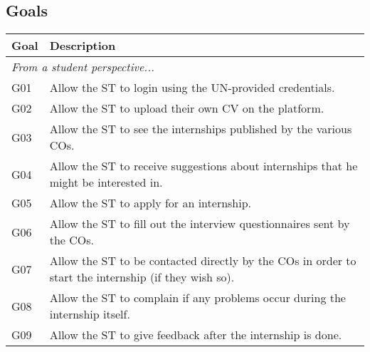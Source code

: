 \subsection{Goals}
\label{subsec:goals}%

\begin{longtable}{|l|p{}|}
    \hline
    \textbf{Goal} & \textbf{Description}                                                                                                                              \\
    \hline \hline
    \multicolumn{2}{|l|}{\textit{From a student perspective...}}                                                                                                      \\
    \hline
    G01           & Allow the ST to login using the UN-provided credentials.                                                                                          \\
    \hline
    G02           & Allow the ST to upload their own CV on the platform.                                                                                              \\
    \hline
    G03           & Allow the ST to see the internships published by the various COs.                                                                                 \\
    \hline
    G04           & Allow the ST to receive suggestions about internships that he might be interested in.                                                             \\
    \hline
    G05           & Allow the ST to apply for an internship.                                                                                                          \\
    \hline
    G06           & Allow the ST to fill out the interview questionnaires sent by the COs.                                                                            \\
    \hline
    G07           & Allow the ST to be contacted directly by the COs in order to start the internship (if they wish so).                                              \\
    \hline
    G08           & Allow the ST to complain if any problems occur during the internship itself.                                                                      \\
    \hline
    G09           & Allow the ST to give feedback after the internship is done.                                                                                       \\

\end{longtable}

